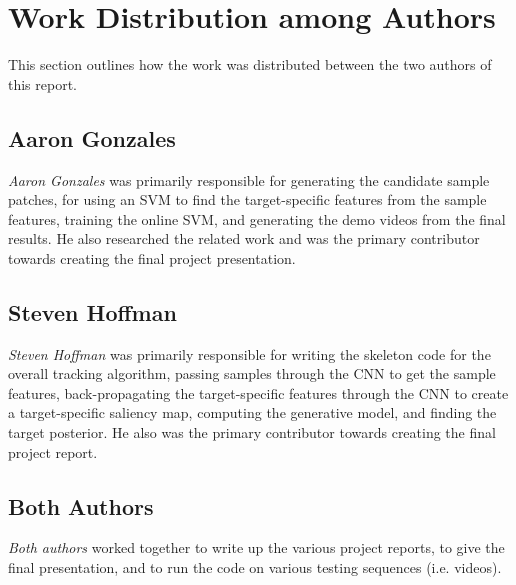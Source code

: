 \documentclass{sig-alternate-05-2015}
\begin{document}
\section{Work Distribution among Authors}
This section outlines how the work was distributed between the two authors of this report. 

\subsection{Aaron Gonzales}
\textit{Aaron Gonzales} was primarily responsible for generating the candidate sample patches, for using an SVM to find the target-specific features from the sample features, training the online SVM, and generating the demo videos from the final results.
He also researched the related work and was the primary contributor towards creating the final project presentation.

\subsection{Steven Hoffman}
\textit{Steven Hoffman} was primarily responsible for writing the skeleton code for the overall tracking algorithm, passing samples through the CNN to get the sample features, back-propagating the target-specific features through the CNN to create a target-specific saliency map, computing the generative model, and finding the target posterior.
He also was the primary contributor towards creating the final project report.

\subsection{Both Authors}
\textit{Both authors} worked together to write up the various project reports, to give the final presentation, and to run the code on various testing sequences (i.e. videos).



\end{document}
